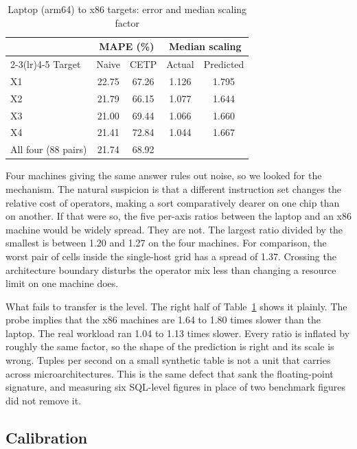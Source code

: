 \documentclass[runningheads]{llncs}
\begin{document}
\begin{table}[t]
\centering
\caption{Laptop (arm64) to x86 targets: error and median scaling factor}
\label{tab:x86}
\begin{tabular}{lcccc}
\toprule
 & \multicolumn{2}{c}{MAPE (\%)} & \multicolumn{2}{c}{Median scaling} \\
\cmidrule(lr){2-3}\cmidrule(lr){4-5}
Target & Naive & CETP & Actual & Predicted \\
\midrule
X1 & 22.75 & 67.26 & 1.126 & 1.795 \\
X2 & 21.79 & 66.15 & 1.077 & 1.644 \\
X3 & 21.00 & 69.44 & 1.066 & 1.660 \\
X4 & 21.41 & 72.84 & 1.044 & 1.667 \\
\midrule
All four (88 pairs) & 21.74 & 68.92 & & \\
\bottomrule
\end{tabular}
\end{table}

Four machines giving the same answer rules out noise, so we looked for the
mechanism. The natural suspicion is that a different instruction set changes
the relative cost of operators, making a sort comparatively dearer on one
chip than on another. If that were so, the five per-axis ratios between the
laptop and an x86 machine would be widely spread. They are not. The largest
ratio divided by the smallest is between 1.20 and 1.27 on the four machines.
For comparison, the worst pair of cells inside the single-host grid has a
spread of 1.37. Crossing the architecture boundary disturbs the operator mix
less than changing a resource limit on one machine does.

What fails to transfer is the level. The right half of Table~\ref{tab:x86}
shows it plainly. The probe implies that the x86 machines are 1.64 to 1.80
times slower than the laptop. The real workload ran 1.04 to 1.13 times
slower. Every ratio is inflated by roughly the same factor, so the shape of
the prediction is right and its scale is wrong. Tuples per second on a small
synthetic table is not a unit that carries across microarchitectures. This
is the same defect that sank the floating-point signature, and measuring six
SQL-level figures in place of two benchmark figures did not remove it.

\subsection{Calibration}
\label{sec:calibresult}
\end{document}
